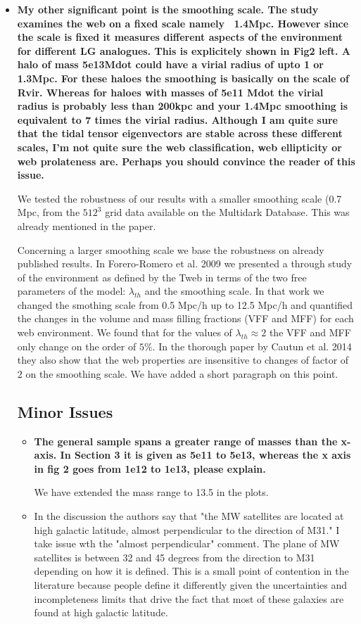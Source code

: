 \documentclass{article}
\begin{document}
\begin{itemize}
\item
{\bf My other significant point is the smoothing scale. The study examines the web on a fixed scale namely ~1.4Mpc. However since the scale is fixed it measures different aspects of the environment for different LG analogues. This is explicitely shown in Fig2 left. A halo of mass 5e13Mdot could have a virial radius of upto 1 or 1.3Mpc. For these haloes the smoothing is basically on the scale of Rvir. Whereas for haloes with masses of 5e11 Mdot the virial radius is probably less than 200kpc and your 1.4Mpc smoothing is equivalent to 7 times the virial radius.  Although I am quite sure that the tidal tensor eigenvectors are stable across these different scales, I'm not quite sure the web classification, web ellipticity or web prolateness are. Perhaps you should convince the reader of this issue.}


We tested the robustness of our results with a smaller smoothing scale (0.7 Mpc, from the $512^3$ grid data available on the Multidark Database. This was already mentioned in the paper.

Concerning a larger smoothing scale we base the robustness on already published results. In Forero-Romero et al. 2009  we presented a through study of the environment as defined by the Tweb in terms of the two free parameters of the model: $\lambda_{th}$ and the smoothing scale. In that work we changed the smothing scale from 0.5 Mpc/h up to 12.5 Mpc/h and quantified the changes in the volume and mass filling fractions (VFF and MFF) for each web environment. We found that for the values of $\lambda_{th}\approx 2$ the VFF and MFF only change on the order of $5\%$. In the thorough paper by Cautun et al. 2014 they also show that the web properties are insensitive to changes of factor of $2$ on the smoothing scale. We have added a short paragraph on this point. 


\subsection{Minor Issues}
\begin{itemize}

\item
{\bf The general sample spans a greater range of masses than the x-axis. In Section 3 it is given as 5e11 to 5e13, whereas the x axis in fig 2 goes from 1e12 to 1e13, please explain.}

We have extended the mass range to 13.5 in the plots.


\item{ In the discussion the authors say that "the MW satellites are located at high galactic latitude, almost perpendicular to the direction of M31." I take issue wth the "almost perpendicular" comment. The plane of MW satellites is between 32 and 45 degrees from the direction to M31 depending on how it is defined. This is a small point of contention in the literature because people define it differently given the uncertainties and incompleteness limits that drive the fact that most of these galaxies are found at high galactic latitude. 

}
\end{itemize}
\end{itemize}
\end{document}
